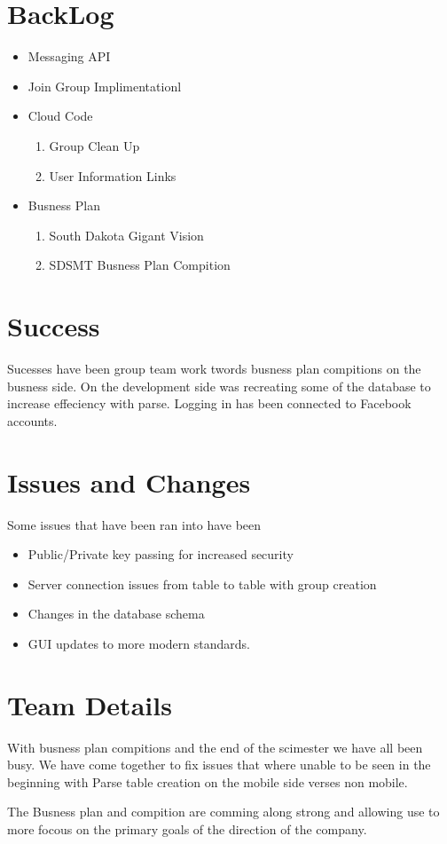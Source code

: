 \documentclass[11pt]{article}
\begin{document}
\section*{BackLog}

	\begin{itemize}
	\item Messaging API
	\item Join Group Implimentationl
	\item Cloud Code
	\begin{enumerate}
	\item Group Clean Up
	\item User Information Links
	\end{enumerate}
	\item Busness Plan
	\begin{enumerate}
	\item South Dakota Gigant Vision
	\item SDSMT Busness Plan Compition
	\end{enumerate}

	\end{itemize}

\section*{Success}
Sucesses have been group team work twords busness plan compitions on the busness side. On the development side was recreating some of the database to increase effeciency with parse. Logging in has been connected to Facebook accounts.


\section*{Issues and Changes}
Some issues that have been ran into have been

	\begin{itemize}
	\item Public/Private key passing for increased security
	\item Server connection issues from table to table with group creation
	\item Changes in the database schema
	\item GUI updates to more modern standards.
	\end{itemize}




	
\section*{Team Details}
With busness plan compitions and the end of the scimester we have all been busy. We have come together to fix issues that where unable to be seen in the beginning with Parse table creation on the mobile side verses non mobile.

The Busness plan and compition are comming along strong and allowing use to more focous on the primary goals of the direction of the company.
\end{document}
